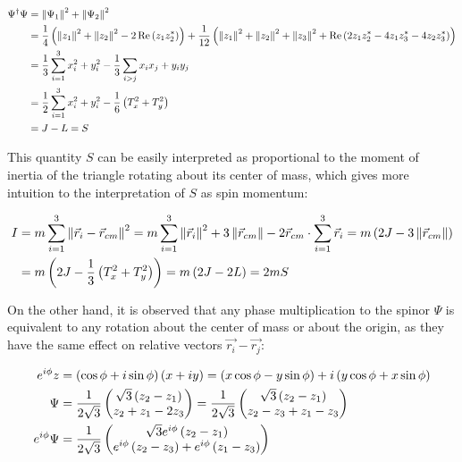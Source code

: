 \small
\begin{align*}
\Psi^\dagger\Psi &= \left\lVert \Psi_1 \right\rVert^2 + \left\lVert \Psi_2 \right\rVert^2 \\
&= \frac{1}{4}\left( \left\lVert z_1 \right\rVert^2 + \left\lVert z_2 \right\rVert^2 - 2\operatorname{Re}\left( z_1z_2^* \right) \right) + \frac{1}{12}\left( \left\lVert z_1 \right\rVert^2 + \left\lVert z_2 \right\rVert^2+ \left\lVert z_3 \right\rVert^2 + \operatorname{Re}\left( 2z_1z_2^*- 4z_1z_3^*- 4z_2z_3^* \right) \right)\\
&= \frac{1}{3}\sum_{i=1}^3 x_i^2 + y_i^2 -\frac{1}{3}\sum_{i > j} x_ix_j + y_iy_j\\
&= \frac{1}{2}\sum_{i=1}^3 x_i^2 + y_i^2 - \frac{1}{6}\left( T_x^2+T_y^2 \right)\\
&= J-L = S
\end{align*}
\normalsize

This quantity $S$ can be easily interpreted as proportional to the moment of inertia of the triangle rotating about its center of mass, which gives more intuition to the interpretation of $S$ as spin momentum:

\begin{align*}
I &= m\sum_{i=1}^3 \left\lVert \vec{r}_i - \vec{r}_{cm} \right\rVert^2 = m\sum_{i=1}^3 \left\lVert \vec{r}_i \right\rVert^2 + 3\left\lVert \vec{r}_{cm} \right\rVert - 2\vec{r}_{cm}\cdot\sum_{i=1}^3\vec{r}_i =m\left( 2J -3\left\lVert \vec{r}_{cm} \right\rVert \right)\\
&= m\left( 2J - \frac{1}{3}\left( T_x^2+T_y^2 \right) \right) = m\left( 2J-2L \right) = 2mS
\end{align*}

On the other hand, it is observed that any phase multiplication to the spinor $\Psi$ is equivalent to any rotation about the center of mass or about the origin, as they have the same effect on relative vectors $\vec{r_i}-\vec{r_j}$:

\begin{align*}
e^{i\phi}z &= \left( \cos{\phi}+i\sin{\phi} \right)\left( x+iy \right) = \left( x\cos{\phi}-y\sin{\phi} \right) + i\left( y\cos{\phi}+x\sin{\phi} \right)\\
\Psi &= \frac{1}{2\sqrt{3}}\begin{pmatrix}\sqrt{3}\left( z_{2}-z_{1} \right)\\
z_{2}+z_{1}-2z_{3}\end{pmatrix}=\frac{1}{2\sqrt{3}}\begin{pmatrix}\sqrt{3}\left( z_{2}-z_{1} \right)\\
z_{2}-z_3+ z_{1}-z_{3}\end{pmatrix}\\
e^{i\phi}\Psi &= \frac{1}{2\sqrt{3}}\begin{pmatrix}\sqrt{3}e^{i\phi}\left( z_{2}-z_{1} \right)\\
e^{i\phi}\left( z_{2}-z_3 \right)+ e^{i\phi}\left( z_{1}-z_{3} \right)\end{pmatrix}
\end{align*}

